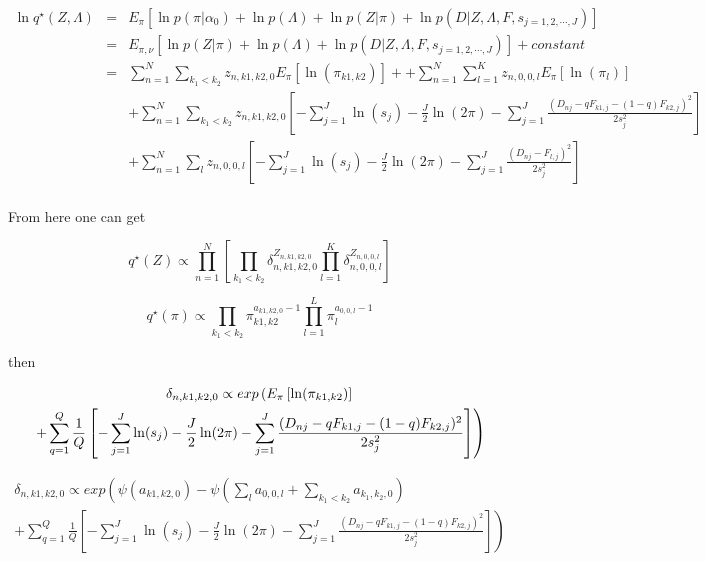 \documentclass[12pt]{article}
\begin{document}
\begin{eqnarray}
\ln q^{\star} (Z, \Lambda)  & = & E_{\pi} \left [ \ln p(\pi|\alpha_0) +  \ln p(\Lambda ) + \ln p(Z | \pi) + \ln p(D | Z, \Lambda, F, s_{j=1,2,\cdots,J}) \right ] \\ \nonumber
  & = & E_{\pi, \nu} \left [ \ln p(Z | \pi) + \ln p(\Lambda ) + \ln p(D | Z, \Lambda, F, s_{j=1,2,\cdots,J}) \right] + constant \\\nonumber
  & = & \sum_{n=1}^{N} \sum_{k_1 < k_2} z_{n, k1, k2, 0}  E_{\pi} \left [ \ln (\pi_{k1, k2}) \right ]  + +  \sum_{n=1}^{N} \sum_{l=1}^{K} z_{n, 0, 0, l} E_{\pi} \left [ \ln (\pi_{l}) \right ] \\ \nonumber
  &&  + \sum_{n=1}^{N} \sum_{k_1 < k_2} z_{n, k1, k2, 0} \left [ - \sum_{j=1}^{J} \ln (s_j) - \frac{J}{2} \ln (2 \pi) - \sum_{j=1}^{J} \frac{(D_{nj} - qF_{k1,j} - (1-q)F_{k2,j})^2}{2s^2_j} \right] \\ \nonumber
  &&  +  \sum_{n=1}^{N} \sum_{l}  z_{n, 0, 0, l} \left [ - \sum_{j=1}^{J} \ln (s_j) - \frac{J}{2} \ln (2 \pi) - \sum_{j=1}^{J} \frac{(D_{nj} - F_{l,j} )^2}{2s^2_j} \right] \\ \nonumber 
\end{eqnarray}

From here one can get 

$$ q^{\star}(Z) \propto \prod_{n=1}^{N} \left[\prod_{k_1 < k_2} \delta_{n, k1, k2, 0}^{Z_{n, k1, k2, 0}}  \prod_{l=1}^{K} \delta_{n, 0, 0, l}^{Z_{n, 0, 0, l}} \right]$$

$$ q^{\star} (\pi) \propto  \prod_{k_1 < k_2} \pi_{k1, k2}^{a_{k1,k2,0} -1} \prod_{l=1}^{L} \pi_{l}^{a_{0,0,l} -1}$$

%
%
%
then 

\begin{multline}
 $$ \delta_{n, k1, k2, 0} \propto exp \left (  E_{\pi} \left [ \ln (\pi_{k1,k2}) \right]  \right. \\
 \left . +  \sum_{q=1}^{Q} \frac{1}{Q} \left [ - \sum_{j=1}^{J} \ln (s_j)  - \frac{J}{2} \ln (2 \pi) - \sum_{j=1}^{J} \frac{(D_{nj} - qF_{k1,j} - (1-q)F_{k2,j})^2}{2s^2_j} \right] \right ) 
\end{multline}

\begin{multline}
  \delta_{n, k1, k2, 0} \propto exp \left ( \psi({a_{k1, k2, 0}}) - \psi(\sum_{l} a_{0, 0, l} + \sum_{k_1 < k_2} a_{k_1, k_2, 0})   \right . \\
  \left . + \sum_{q=1}^{Q} \frac{1}{Q} \left [ - \sum_{j=1}^{J} \ln (s_j)  - \frac{J}{2} \ln (2 \pi) -  \sum_{j=1}^{J} \frac{(D_{nj} - qF_{k1,j} - (1-q)F_{k2,j})^2}{2s^2_j} \right] \right ) 
\end{multline}
\end{document}
